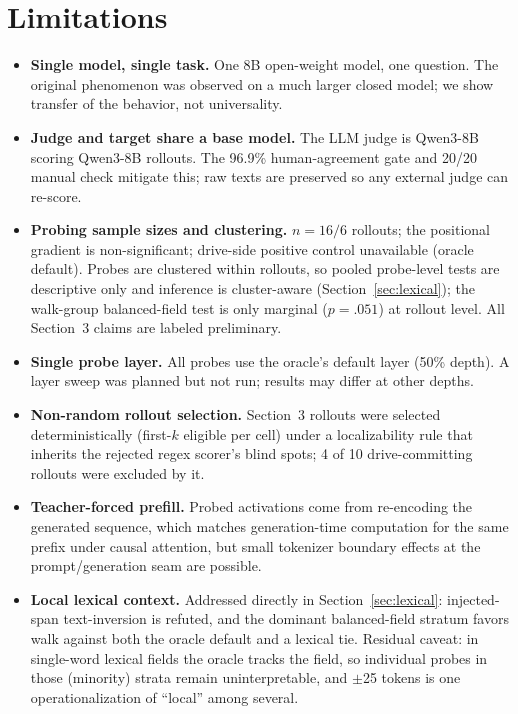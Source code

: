 \documentclass[11pt]{article}
\begin{document}
\section{Limitations}

\begin{itemize}
\item \textbf{Single model, single task.} One 8B open-weight model, one
question. The original phenomenon was observed on a much larger closed
model; we show transfer of the behavior, not universality.
\item \textbf{Judge and target share a base model.} The LLM judge is
Qwen3-8B scoring Qwen3-8B rollouts. The 96.9\% human-agreement gate and
20/20 manual check mitigate this; raw texts are preserved so any external
judge can re-score.
\item \textbf{Probing sample sizes and clustering.} $n=16/6$ rollouts; the
positional gradient is non-significant; drive-side positive control
unavailable (oracle default). Probes are clustered within rollouts, so
pooled probe-level tests are descriptive only and inference is
cluster-aware (Section~\ref{sec:lexical}); the walk-group balanced-field
test is only marginal ($p=.051$) at rollout level. All Section~3 claims
are labeled preliminary.
\item \textbf{Single probe layer.} All probes use the oracle's default
layer (50\% depth). A layer sweep was planned but not run; results may
differ at other depths.
\item \textbf{Non-random rollout selection.} Section~3 rollouts were
selected deterministically (first-$k$ eligible per cell) under a
localizability rule that inherits the rejected regex scorer's blind spots;
4 of 10 drive-committing rollouts were excluded by it.
\item \textbf{Teacher-forced prefill.} Probed activations come from
re-encoding the generated sequence, which matches generation-time
computation for the same prefix under causal attention, but small
tokenizer boundary effects at the prompt/generation seam are possible.
\item \textbf{Local lexical context.} Addressed directly in
Section~\ref{sec:lexical}: injected-span text-inversion is refuted, and
the dominant balanced-field stratum favors walk against both the oracle
default and a lexical tie. Residual caveat: in single-word lexical fields
the oracle tracks the field, so individual probes in those (minority)
strata remain uninterpretable, and $\pm$25 tokens is one
operationalization of ``local'' among several.
\end{itemize}
\end{document}
